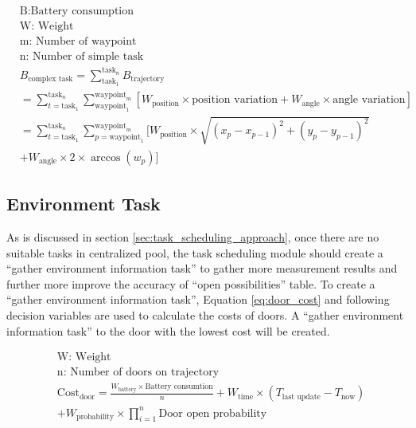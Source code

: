 \begin{equation}
\begin{aligned}
\label{eq:battery_consumption}
& \mbox{B:Battery consumption } \\
& \mbox{W: Weight } \\
& \mbox{m: Number of waypoint } \\
& \mbox{n: Number of simple task} \\
& B_{\mbox{complex task}} = \sum_{\mbox{task}_1}^{\mbox{task}_n} B_{\mbox{trajectory}} \\
& = \sum_{t = \mbox{task}_1}^{\mbox{task}_n} \sum_{\mbox{waypoint}_1}^{\mbox{waypoint}_m} [W_{\mbox{position}} \times \mbox{position variation}+W_{\mbox{angle}}  \times \mbox{angle variation}]\\
& = \sum_{t = \mbox{task}_1}^{\mbox{task}_n} \sum_{p = \mbox{waypoint}_1}^{\mbox{waypoint}_m} [ W_{\mbox{position}} \times \sqrt{(x_p-x_{p-1} )^2+(y_p-y_{p-1} )^2} \\
&   + W_{\mbox{angle}} \times 2 \times \arccos(w_p)] 
\end{aligned}
\end{equation}


\subsection{Environment Task}
As is discussed in section \ref{sec:task_scheduling_approach}, once there are no suitable tasks in centralized pool, the task scheduling module should create a ``gather environment information task'' to gather more measurement results and further more improve the accuracy of ``open possibilities'' table.
To create a ``gather environment information task'', Equation \ref{eq:door_cost} and following decision variables are used to calculate the costs of doors. A ``gather environment information task'' to the door with the lowest cost will be created.

\begin{equation}
	\label{eq:door_cost}
	\begin{aligned}
	& \mbox{W: Weight } \\
	& \mbox{n: Number of doors on trajectory} \\	
	& \mbox{Cost}_{\mbox{door}} = \frac{W_{\mbox{battery}} \times \mbox{Battery consumtion}}{n} + W_{\mbox{time}} \times (T_{\mbox{last update}} - T_{\mbox{now}}) \\
	& + W_{\mbox{probability}} \times \prod\limits_{i=1}^n \mbox{Door open probability}
	\end{aligned}
\end{equation}

